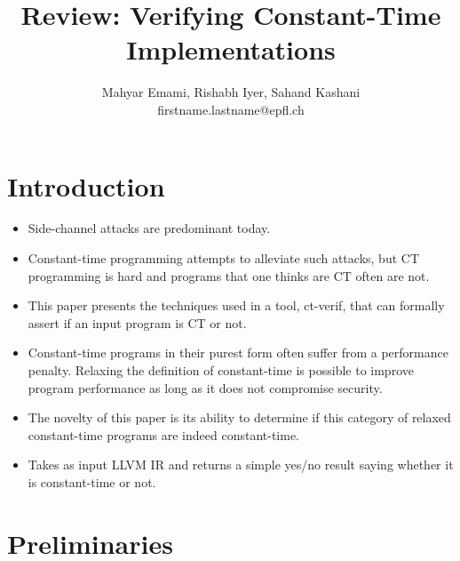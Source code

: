 \documentclass[11pt,a4paper]{article}
\title{Review: Verifying Constant-Time Implementations}
\author{Mahyar Emami, Rishabh Iyer, Sahand Kashani \\ firstname.lastname@epfl.ch}
\begin{document}
\maketitle

\section{Introduction}

\begin{itemize}
  \item Side-channel attacks are predominant today.
  \item Constant-time programming attempts to alleviate such attacks, but CT programming is hard and programs that one thinks are CT often are not.
  \item This paper presents the techniques used in a tool, ct-verif, that can formally assert if an input program is CT or not.
  \item Constant-time programs in their purest form often suffer from a performance penalty. Relaxing the definition of constant-time is possible to improve program performance as long as it does not compromise security.
  \item The novelty of this paper is its ability to determine if this category of relaxed constant-time programs are indeed constant-time.
  \item Takes as input LLVM IR and returns a simple yes/no result saying whether it is constant-time or not.
\end{itemize}

\section{Preliminaries}
\end{document}

